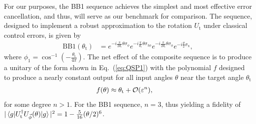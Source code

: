 \documentclass[aps,prx,showpacs,notitlepage,twocolumn,superscriptaddress,nofootinbib,preprintnumbers,floatfix,10pt, longbibliography]{revtex4-2}
\begin{document}
For our purposes, the BB1 sequence achieves the simplest and most effective error cancellation, and thus, will serve as our benchmark for comparison. The sequence, designed to implement a robust approximation to the rotation $U_\mathrm{t}$ under classical control errors, is given by
\begin{align}
 \mathrm{BB1}(\theta_\mathrm{t})&=e^{-i\frac{\pi}{2\theta_\mathrm{t}}\theta\sigma_\phi}e^{-i\frac{\pi}{\theta_\mathrm{t}}\theta\sigma_{3\phi}}e^{-i\frac{\pi}{2\theta_\mathrm{t}}\theta\sigma_\phi}e^{-i\frac{\theta}{2}\sigma_\mathrm{x}},
 \label{eq:BB1_classical}
\end{align}
where $\phi_1 = \cos^{-1}\left(-\frac{\theta_\mathrm{t}}{4\pi}\right)$. 
 The net effect of the composite sequence is to produce a unitary of the form shown in Eq.~(\ref{eq:QSP1}) with the polynomial $f$ designed to produce a nearly constant output for all input angles $\theta$ near the target angle $\theta_\textrm{t}$
\begin{align}
    f(\theta) &\approx \theta_\textrm{t} + {\cal O}(\varepsilon^{n}),
\end{align}
for some degree $n> 1$.
For the BB1 sequence, $n=3$, thus yielding a fidelity of $|\braket{g|U^\dagger_\mathrm{t}U_{\vec{\phi}}(\theta)|g}|^2=1-\frac{5}{16}(\theta/2)^6$. 
\end{document}
